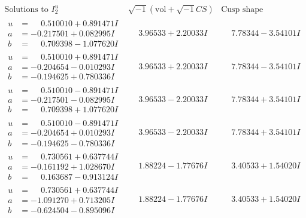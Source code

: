 \documentclass[1p]{elsarticle_modified}
\theoremstyle{definition}
\newcommand{\I}{\sqrt{-1}}
\begin{document}
$$\begin{array}{c|c|c}  
\text{Solutions to }I^u_{2}& \I (\text{vol} + \sqrt{-1}CS) & \text{Cusp shape}\\
 \hline 
\begin{aligned}
u &= \phantom{-}0.510010 + 0.891471 I \\
a &= -0.217501 + 0.082995 I \\
b &= \phantom{-}0.709398 - 1.077620 I\end{aligned}
 & \phantom{-}3.96533 + 2.20033 I & \phantom{-}7.78344 - 3.54101 I \\ \hline\begin{aligned}
u &= \phantom{-}0.510010 + 0.891471 I \\
a &= -0.204654 - 0.010293 I \\
b &= -0.194625 + 0.780336 I\end{aligned}
 & \phantom{-}3.96533 + 2.20033 I & \phantom{-}7.78344 - 3.54101 I \\ \hline\begin{aligned}
u &= \phantom{-}0.510010 - 0.891471 I \\
a &= -0.217501 - 0.082995 I \\
b &= \phantom{-}0.709398 + 1.077620 I\end{aligned}
 & \phantom{-}3.96533 - 2.20033 I & \phantom{-}7.78344 + 3.54101 I \\ \hline\begin{aligned}
u &= \phantom{-}0.510010 - 0.891471 I \\
a &= -0.204654 + 0.010293 I \\
b &= -0.194625 - 0.780336 I\end{aligned}
 & \phantom{-}3.96533 - 2.20033 I & \phantom{-}7.78344 + 3.54101 I \\ \hline\begin{aligned}
u &= \phantom{-}0.730561 + 0.637744 I \\
a &= -0.161192 + 1.028670 I \\
b &= \phantom{-}0.163687 - 0.913124 I\end{aligned}
 & \phantom{-}1.88224 - 1.77676 I & \phantom{-}3.40533 + 1.54020 I \\ \hline\begin{aligned}
u &= \phantom{-}0.730561 + 0.637744 I \\
a &= -1.091270 + 0.713205 I \\
b &= -0.624504 - 0.895096 I\end{aligned}
 & \phantom{-}1.88224 - 1.77676 I & \phantom{-}3.40533 + 1.54020 I \\ \hline\begin{aligned}

\end{aligned}
\end{array}$$
\end{document}
